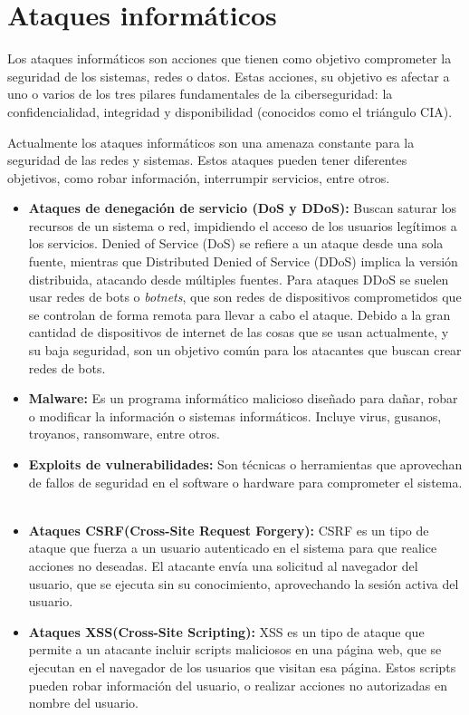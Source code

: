 \section{Ataques informáticos}
Los ataques informáticos son acciones que tienen como objetivo comprometer la seguridad de los sistemas, redes o datos.
Estas acciones, su objetivo es afectar a uno o varios de los tres pilares fundamentales de la ciberseguridad: la confidencialidad, integridad y disponibilidad (conocidos como el triángulo CIA).~\cite{NicholasEdwards2020, Chaeikar2012} 

Actualmente los ataques informáticos son una amenaza constante para la seguridad de las redes y sistemas. Estos ataques pueden tener diferentes objetivos, como robar información, interrumpir servicios, entre otros.

\begin{itemize}
    \item \textbf{Ataques de denegación de servicio (DoS y DDoS):} Buscan saturar los recursos de un sistema o red, impidiendo el acceso de los usuarios legítimos a los servicios. Denied of Service (DoS) se refiere a un ataque desde una sola fuente, mientras que Distributed Denied of Service (DDoS) implica la versión distribuida, atacando desde múltiples fuentes. Para ataques DDoS se suelen usar redes de bots o \textit{botnets}, que son redes de dispositivos comprometidos que se controlan de forma remota para llevar a cabo el ataque. Debido a la gran cantidad de dispositivos de internet de las cosas que se usan actualmente, y su baja seguridad, son un objetivo común para los atacantes que buscan crear redes de bots. ~\cite{kolias2017}

    \item \textbf{Malware:} Es un programa informático malicioso diseñado para dañar, robar o modificar la información o sistemas informáticos. Incluye virus, gusanos, troyanos, ransomware, entre otros. ~\cite{SushilJajodia2025}

    \item \textbf{Exploits de vulnerabilidades:} Son técnicas o herramientas que aprovechan de fallos de seguridad en el software o hardware para comprometer el sistema. ~\cite{SushilJajodia2025}

	\item \textbf{Ataques CSRF(Cross-Site Request Forgery):} CSRF es un tipo de ataque que fuerza a un usuario autenticado en el sistema para que realice acciones no deseadas. El atacante envía una solicitud al navegador del usuario, que se ejecuta sin su conocimiento, aprovechando la sesión activa del usuario.

	\item \textbf{Ataques XSS(Cross-Site Scripting):} XSS es un tipo de ataque que permite a un atacante incluir scripts maliciosos en una página web, que se ejecutan en el navegador de los usuarios que visitan esa página. Estos scripts pueden robar información del usuario, o realizar acciones no autorizadas en nombre del usuario.
\end{itemize}

